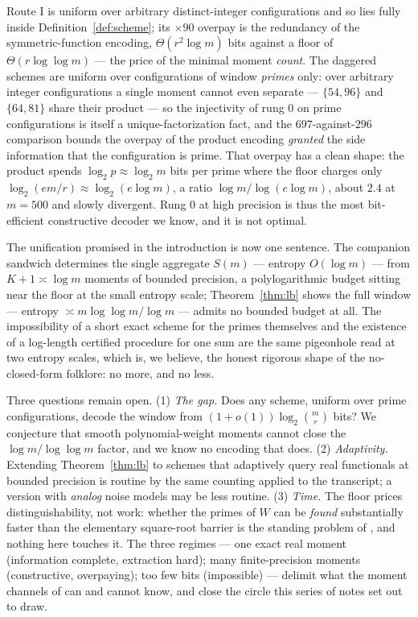 \documentclass[11pt]{article}
\theoremstyle{remark}
\begin{document}
\noindent
Route I is uniform over arbitrary distinct-integer configurations and so lies fully inside
Definition~\ref{def:scheme}; its $\times 90$ overpay is the redundancy of the symmetric-function
encoding, $\Theta(r^2 \log m)$ bits against a floor of $\Theta(r \log\log m)$ --- the price of the
minimal moment \emph{count}. The daggered schemes are uniform over configurations of window
\emph{primes} only: over arbitrary integer configurations a single moment cannot even separate ---
$\{54, 96\}$ and $\{64, 81\}$ share their product --- so the injectivity of rung $0$ on prime
configurations is itself a unique-factorization fact, and the $697$-against-$296$ comparison bounds
the overpay of the product encoding \emph{granted} the side information that the configuration is
prime. That overpay has a clean shape: the product spends $\log_2 p \approx \log_2 m$ bits per prime
where the floor charges only $\log_2(em/r) \approx \log_2(e \log m)$, a ratio
$\log m / \log(e\log m)$, about $2.4$ at $m = 500$ and slowly divergent. Rung $0$ at high precision is
thus the most bit-efficient constructive decoder we know, and it is not optimal.

The unification promised in the introduction is now one sentence. The companion sandwich
\cite{CompanionII} determines the single aggregate $S(m)$ --- entropy $O(\log m)$ --- from
$K + 1 \asymp \log m$ moments of bounded precision, a polylogarithmic budget sitting near the floor at
the small entropy scale; Theorem~\ref{thm:lb} shows the full window --- entropy
$\asymp m \log\log m/\log m$ --- admits no bounded budget at all. The impossibility of a short exact
scheme for the primes themselves and the existence of a log-length certified procedure for one sum are
the same pigeonhole read at two entropy scales, which is, we believe, the honest rigorous shape of the
no-closed-form folklore: no more, and no less.

Three questions remain open. (1) \emph{The gap.} Does any scheme, uniform over prime configurations,
decode the window from $(1 + o(1)) \log_2\binom{m}{r}$ bits? We conjecture that smooth
polynomial-weight moments cannot close the $\log m / \log\log m$ factor, and we know no encoding that
does. (2) \emph{Adaptivity.} Extending Theorem~\ref{thm:lb} to schemes that adaptively query real
functionals at bounded precision is routine by the same counting applied to the transcript; a version
with \emph{analog} noise models may be less routine. (3) \emph{Time.} The floor prices
distinguishability, not work: whether the primes of $W$ can be \emph{found} substantially faster than
the elementary square-root barrier is the standing problem of \cite{Polymath}, and nothing here
touches it. The three regimes --- one exact real moment (information complete, extraction hard); many
finite-precision moments (constructive, overpaying); too few bits (impossible) --- delimit what the
moment channels of \cite{CompanionI, CompanionII} can and cannot know, and close the circle this
series of notes set out to draw.
\end{document}

